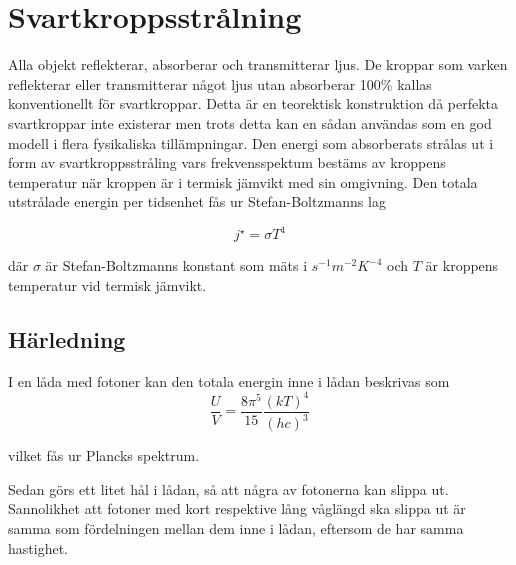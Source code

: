 \section{Svartkroppsstrålning}
\label{sec:blackbody}

Alla objekt reflekterar, absorberar och transmitterar ljus. De kroppar som varken 
reflekterar eller transmitterar något ljus utan absorberar 100\% kallas konventionellt för 
svartkroppar. Detta är en teorektisk konstruktion då perfekta svartkroppar inte existerar 
men trots detta kan en sådan användas som en god modell i flera fysikaliska 
tillämpningar. Den energi som absorberats strålas ut i form av svartkroppsstråling vars 
frekvensspektum bestäms av kroppens temperatur när kroppen är i termisk jämvikt med
 sin omgivning. Den totala utstrålade energin per tidsenhet fås ur Stefan-Boltzmanns lag
 
\begin{equation}\boxed{ \; \; \;
j^{\star} = \sigma T^{4}
\; \; \; }
\end{equation}

\noindent
där $\sigma$ är Stefan-Boltzmanns konstant som mäts i $\unit{s^{-1}m^{-2}K^{-4}}$ och $T$ är kroppens temperatur vid termisk jämvikt.

\subsection{Härledning}
I en låda med fotoner kan den totala energin inne i lådan beskrivas som 
\begin{equation}
\frac{U}{V}=\frac{8\pi^5}{15}\frac{(kT)^4}{(hc)^3}
\end{equation}

vilket fås ur Plancks spektrum.\cite{schroeder00}

Sedan görs ett litet hål i lådan, så att några av fotonerna kan slippa ut. Sannolikhet att fotoner med kort respektive lång våglängd ska slippa ut är samma som fördelningen mellan dem inne i lådan, eftersom de har samma hastighet.

